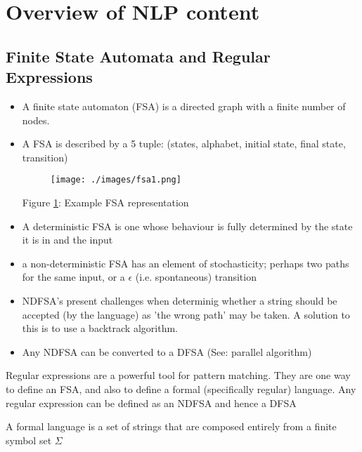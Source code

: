 \documentclass[]{article}
\begin{document}
\section{Overview of NLP content}
\subsection{Finite State Automata and Regular Expressions}
\begin{itemize}
	\item A finite state automaton (FSA) is a directed graph with a finite number of nodes.

	\item A FSA is described by a 5 tuple: (states, alphabet, initial state, final state, transition)
	
	\begin{figure}[h!]
		\begin{center}
			\texttt{[image: ./images/fsa1.png]}
			\label{fig:fsa1}
			\end{center}
	\end{figure}
	
	\begin{center}
	Figure \ref{fig:fsa1}: Example FSA representation
	\end{center}
	

	\item A deterministic FSA is one whose behaviour is fully determined by the state it is in and the input
	

	\item a non-deterministic FSA has an element of stochasticity; perhaps two paths for the same input, or a $\epsilon$ (i.e. spontaneous) transition 
	
	\item NDFSA's present challenges when determinig whether a string should be accepted (by the language) as 'the wrong path' may be taken. A solution to this is to use a backtrack algorithm.
	
	\item Any NDFSA can be converted to a DFSA (See: parallel algorithm)
	
	

\end{itemize}
Regular expressions are a powerful tool for pattern matching. 
They are one way to define an FSA, and also to define a formal (specifically regular) language. Any regular expression can be defined as an NDFSA and hence a DFSA


A formal language is a set of strings that are composed entirely from a finite symbol set $\Sigma$
\end{document}
